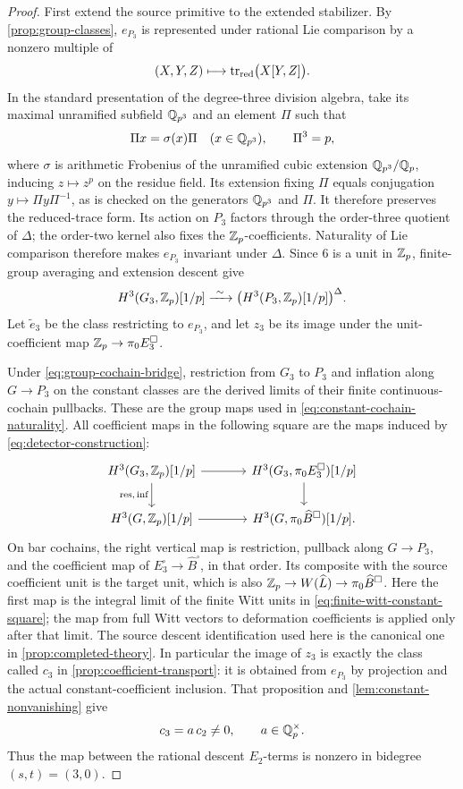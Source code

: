 \begin{proof}
First extend the source primitive to the extended stabilizer.
By \cref{prop:group-classes}, $e_{P_3}$ is represented under rational
Lie comparison by a nonzero multiple of
\[
 (X,Y,Z)\longmapsto\operatorname{tr}_{\mathrm{red}}\bigl(X[Y,Z]\bigr).
\]
In the standard presentation of the degree-three division algebra,
take its maximal unramified subfield $\mathbb Q_{p^3}$ and an element $\Pi$
such that
\[
 \Pi x=\sigma(x)\Pi\quad(x\in\mathbb Q_{p^3}),\qquad \Pi^3=p,
\]
where $\sigma$ is arithmetic Frobenius of the unramified cubic
extension $\mathbb Q_{p^3}/\mathbb Q_p$, inducing $z\mapsto z^p$ on the residue
field. Its extension fixing $\Pi$ equals conjugation
$y\mapsto\Pi y\Pi^{-1}$, as is checked on the generators
$\mathbb Q_{p^3}$ and $\Pi$. It therefore preserves the reduced-trace form.
Its action on $P_3$ factors through the order-three quotient of
$\Delta$; the order-two kernel also fixes the $\mathbb Z_p$-coefficients.
Naturality of Lie comparison therefore makes $e_{P_3}$ invariant under
$\Delta$.  Since $6$ is a unit in $\mathbb Z_p$, finite-group averaging and
extension descent give
\[
 H^3(G_3,\mathbb Z_p)[1/p]
    \xrightarrow{\ \sim\ }
       \bigl(H^3(P_3,\mathbb Z_p)[1/p]\bigr)^\Delta.
\]
Let $\widetilde e_3$ be the class restricting to $e_{P_3}$, and let
$z_3$ be its image under the unit-coefficient map
$\mathbb Z_p\to\pi_0E_3^{\square}$.

Under \eqref{eq:group-cochain-bridge}, restriction from $G_3$ to $P_3$
and inflation along $G\to P_3$ on the constant classes are the
derived limits of their finite continuous-cochain pullbacks.  These
are the group maps used in \eqref{eq:constant-cochain-naturality}.
All coefficient maps in the following square are the maps induced by
\eqref{eq:detector-construction}:
\[
\begin{tikzcd}[column sep=large]
 H^3(G_3,\Z_p)[1/p]
   \arrow[r] \arrow[d,"{\mathrm{res},\,\mathrm{inf}}"']
 & H^3(G_3,\pi_0E_3^{\square})[1/p]\arrow[d]\\
 H^3(G,\Z_p)[1/p]\arrow[r]
 & H^3(G,\pi_0\widehat B^{\square})[1/p].
\end{tikzcd}
\]
On bar cochains, the right vertical map is restriction, pullback along
$G\to P_3$, and the coefficient map of
$E_3^{\square}\to\widehat B^{\square}$, in that order.
Its composite with the source coefficient unit is the target unit,
which is also $\mathbb Z_p\to W(\widehat L)\to\pi_0\widehat B^{\square}$.
Here the first map is the integral limit of the finite Witt units in
\eqref{eq:finite-witt-constant-square}; the map from full Witt vectors
to deformation coefficients is applied only after that limit.
The source descent identification used here is the canonical one in
\cref{prop:completed-theory}.
In particular the image of $z_3$ is exactly the class called $c_3$ in
\cref{prop:coefficient-transport}: it is obtained from $e_{P_3}$ by
projection and the actual constant-coefficient inclusion.  That
proposition and \cref{lem:constant-nonvanishing} give
\[
 c_3=a\,c_2\ne0,\qquad a\in\mathbb Q_p^{\times}.
\]
Thus the map between the rational descent $E_2$-terms is nonzero in
bidegree $(s,t)=(3,0)$.


\end{proof}
